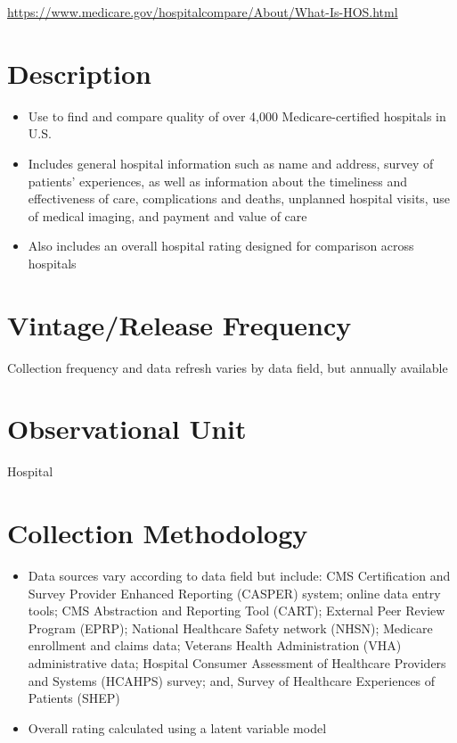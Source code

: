 \documentclass[
]{book}
\providecommand{\tightlist}{%
  \setlength{\itemsep}{0pt}\setlength{\parskip}{0pt}}
\begin{document}
\url{https://www.medicare.gov/hospitalcompare/About/What-Is-HOS.html}

\hypertarget{description-32}{%
\section{Description}\label{description-32}}

\begin{itemize}
\tightlist
\item
  Use to find and compare quality of over 4,000 Medicare-certified hospitals in U.S.
\item
  Includes general hospital information such as name and address, survey of patients' experiences, as well as information about the timeliness and effectiveness of care, complications and deaths, unplanned hospital visits, use of medical imaging, and payment and value of care
\item
  Also includes an overall hospital rating designed for comparison across hospitals
\end{itemize}

\hypertarget{vintagerelease-frequency-32}{%
\section{Vintage/Release Frequency}\label{vintagerelease-frequency-32}}

Collection frequency and data refresh varies by data field, but annually available

\hypertarget{observational-unit-32}{%
\section{Observational Unit}\label{observational-unit-32}}

Hospital

\hypertarget{collection-methodology-32}{%
\section{Collection Methodology}\label{collection-methodology-32}}

\begin{itemize}
\tightlist
\item
  Data sources vary according to data field but include: CMS Certification and Survey Provider Enhanced Reporting (CASPER) system; online data entry tools; CMS Abstraction and Reporting Tool (CART); External Peer Review Program (EPRP); National Healthcare Safety network (NHSN); Medicare enrollment and claims data; Veterans Health Administration (VHA) administrative data; Hospital Consumer Assessment of Healthcare Providers and Systems (HCAHPS) survey; and, Survey of Healthcare Experiences of Patients (SHEP)
\item
  Overall rating calculated using a latent variable model
\end{itemize}
\end{document}
